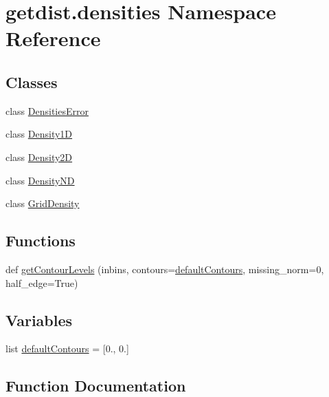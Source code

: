 \hypertarget{namespacegetdist_1_1densities}{}\section{getdist.\+densities Namespace Reference}
\label{namespacegetdist_1_1densities}
\subsection*{Classes}
\begin{DoxyCompactItemize}
\item 
class \mbox{\hyperlink{classgetdist_1_1densities_1_1DensitiesError}{Densities\+Error}}
\item 
class \mbox{\hyperlink{classgetdist_1_1densities_1_1Density1D}{Density1D}}
\item 
class \mbox{\hyperlink{classgetdist_1_1densities_1_1Density2D}{Density2D}}
\item 
class \mbox{\hyperlink{classgetdist_1_1densities_1_1DensityND}{Density\+ND}}
\item 
class \mbox{\hyperlink{classgetdist_1_1densities_1_1GridDensity}{Grid\+Density}}
\end{DoxyCompactItemize}
\subsection*{Functions}
\begin{DoxyCompactItemize}
\item 
def \mbox{\hyperlink{namespacegetdist_1_1densities_a71719515c275dc72aa2d93ae32e2dbeb}{get\+Contour\+Levels}} (inbins, contours=\mbox{\hyperlink{namespacegetdist_1_1densities_a93d19accaa564f6252d80ae48a40ae3b}{default\+Contours}}, missing\+\_\+norm=0, half\+\_\+edge=True)
\end{DoxyCompactItemize}
\subsection*{Variables}
\begin{DoxyCompactItemize}
\item 
list \mbox{\hyperlink{namespacegetdist_1_1densities_a93d19accaa564f6252d80ae48a40ae3b}{default\+Contours}} = \mbox{[}0., 0.\mbox{]}
\end{DoxyCompactItemize}


\subsection{Function Documentation}
\mbox{\label{namespacegetdist_1_1densities_a71719515c275dc72aa2d93ae32e2dbeb}} 
